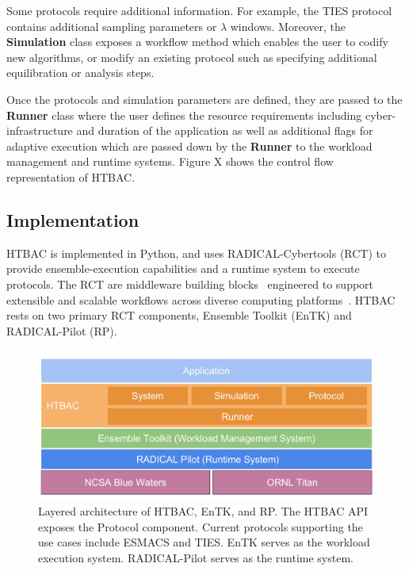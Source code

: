Some protocols require additional information. For 
example, the TIES protocol contains additional sampling parameters or   
$\lambda$ windows. Moreover, the \textbf{Simulation} class exposes a 
workflow method which enables the user to codify new algorithms, or modify
an existing protocol such as specifying additional equilibration or analysis 
steps. 

Once the protocols and simulation parameters 
are defined, they are passed to the \textbf{Runner} class where the user defines 
the resource requirements including cyber-infrastructure and duration of the 
application as well as additional flags for adaptive execution which are passed 
down by the \textbf{Runner} to the workload management and runtime systems. 
Figure X shows the control flow representation of HTBAC. 



\subsection{Implementation}

HTBAC is implemented in Python, and uses RADICAL-Cybertools (RCT) to provide 
ensemble-execution capabilities and a runtime system to execute protocols. 
The RCT are middleware building blocks~\cite{review_bb_2016} engineered to 
support extensible and scalable workflows across diverse computing
platforms~\cite{turilli2017comprehensive}. HTBAC rests on two primary RCT 
components, Ensemble Toolkit (EnTK) and RADICAL-Pilot (RP). 

\begin{figure}
  \centering
   \includegraphics[width=\columnwidth]{figures/building_blocks.pdf}
  \caption{Layered architecture of HTBAC, EnTK, and RP. The HTBAC API exposes 
  the Protocol component. Current protocols supporting the use cases include 
  ESMACS and TIES. EnTK serves as the workload execution system. RADICAL-Pilot 
  serves as the runtime system.}
\label{fig:blockdiagram}
\end{figure}

